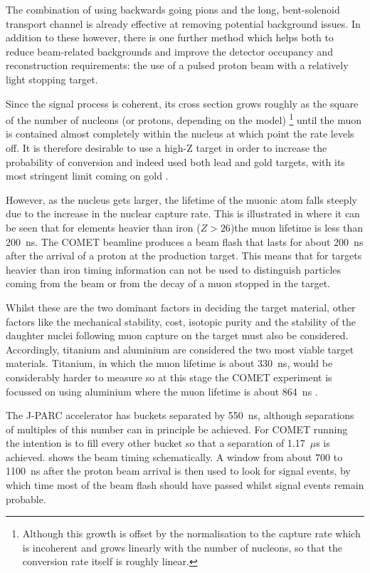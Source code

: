 The combination of using backwards going pions and the long, bent-solenoid transport channel is already effective at removing potential background issues.
In addition to these however, there is one further method which helps both to reduce beam-related backgrounds and improve the detector occupancy and reconstruction requirements:
the use of a pulsed proton beam with a relatively light stopping target.

Since the signal process is coherent, its cross section grows roughly as the square of the number of nucleons (or protons, depending on the model)%
\footnote{Although this growth is offset by the normalisation to the capture rate which is incoherent and grows linearly with the number of nucleons, so that the conversion rate itself is roughly linear.}
until the muon is contained almost completely within the nucleus at which point the rate levels off.
It is therefore desirable to use a high-Z target in order to increase the probability of conversion and indeed \sindrumII used both lead and gold targets, with its most stringent limit coming on gold \cite{sindrum2006}.

However, as the nucleus gets larger, the lifetime of the muonic atom falls steeply due to the increase in the nuclear capture rate.
This is illustrated in  where it can be seen that for elements heavier than iron ($Z>26$)the muon lifetime is less than 200~ns.
The COMET beamline produces a beam flash that lasts for about 200~ns after the arrival of a proton at the production target.
This means that for targets heavier than iron timing information can not be used to distinguish particles coming from the beam or from the decay of a muon stopped in the target.

Whilst these are the two dominant factors in deciding the target material, other factors like the mechanical stability, cost, isotopic purity and the stability of the daughter nuclei following muon capture on the target must also be considered.
Accordingly, titanium and aluminium are considered the two most viable target materials.  
Titanium, in which the muon lifetime is about 330~ns, would be considerably harder to measure \mueconv so at this stage the COMET experiment is focussed on using aluminium where the muon lifetime is about 864~ns \cite{Suzuki1987}.

The J-PARC accelerator has buckets separated by 550~ns, although separations of multiples of this number can in principle be achieved.
For COMET running the intention is to fill every other bucket so that a separation of 1.17~$\mu$s is achieved.
 shows the beam timing schematically.  
A window from about 700 to 1100~ns after the proton beam arrival is then used to look for signal events, by which time most of the beam flash should have passed whilst signal events remain probable.

